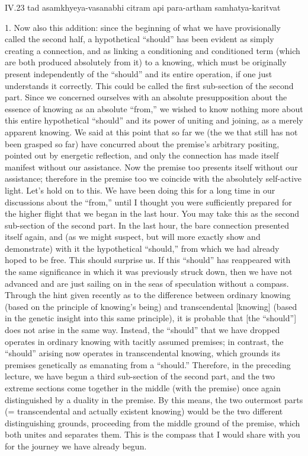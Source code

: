 IV.23
tad asamkhyeya-vasanabhi citram api para-artham samhatya-karitvat

1. Now also this addition:
since the beginning of what we
have provisionally called the second half,
a hypothetical “should” has been evident
as simply creating a connection,
and as linking a conditioning and conditioned term
(which are both produced absolutely from it)
to a knowing, which must be originally present
independently of the “should”
and its entire operation,
if one just understands it correctly.
This could be called the first
sub-section of the second part.
Since we concerned ourselves with
an absolute presupposition about
the essence of knowing as an absolute “from,”
we wished to know nothing more about
this entire hypothetical “should”
and its power of uniting and joining,
as a merely apparent knowing.
We said at this point that so far we
(the we that still has not been grasped so far)
have concurred about the premise’s arbitrary positing,
pointed out by energetic reflection,
and only the connection has made itself manifest
without our assistance.
Now the premise too presents itself without our assistance;
therefore in the premise too we coincide
with the absolutely self-active light.
Let’s hold on to this.
We have been doing this for a long time
in our discussions about the “from,”
until I thought you were sufficiently prepared for
the higher flight that we began in the last hour.
You may take this as the second sub-section of the second part.
In the last hour, the bare connection presented itself again,
and (as we might suspect, but will more exactly show and demonstrate)
with it the hypothetical “should,”
from which we had already hoped to be free.
This should surprise us.
If this “should” has reappeared with the same significance
in which it was previously struck down,
then we have not advanced
and are just sailing on
in the seas of speculation without a compass.
Through the hint given recently as to
the difference between ordinary knowing
(based on the principle of knowing’s being)
and transcendental [knowing]
(based in the genetic insight into this same principle),
it is probable that [the “should”] does
not arise in the same way.
Instead, the “should” that we have dropped
operates in ordinary knowing
with tacitly assumed premises;
in contrast, the “should” arising now
operates in transcendental knowing,
which grounds its premises genetically
as emanating from a “should.”
Therefore, in the preceding lecture,
we have begun a third sub-section of the second part,
and the two extreme sections come together
in the middle (with the premise) once again
distinguished by a duality in the premise.
By this means, the two outermost parts
(= transcendental and actually existent knowing)
would be the two different distinguishing grounds,
proceeding from the middle ground of the premise,
which both unites and separates them.
This is the compass that I would share with you
for the journey we have already begun.


